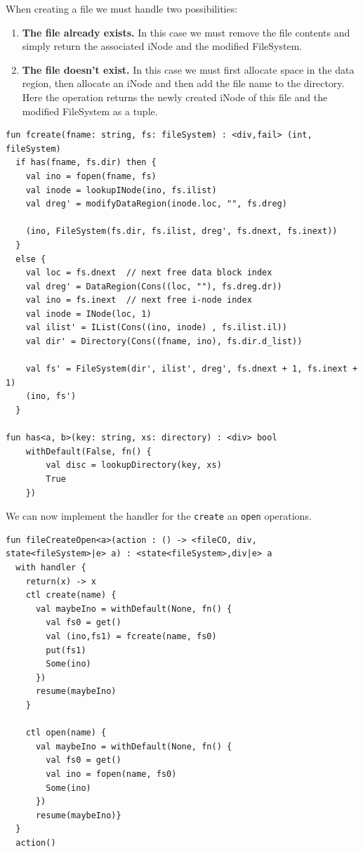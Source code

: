 \documentclass[logo,bsc,singlespacing,parskip]{infthesis}
\begin{document}
When creating a file we must handle two possibilities:
\begin{enumerate}
    \item \textbf{The file already exists.} In this case we must remove the file contents and simply return the associated  iNode and the modified FileSystem.
    \item \textbf{The file doesn't exist.} In this case we must first allocate space in the data region, then allocate an iNode and then add the file name to the directory. Here the operation returns the newly created iNode of this file and the modified FileSystem as a tuple.
\end{enumerate}

\begin{lstlisting}
fun fcreate(fname: string, fs: fileSystem) : <div,fail> (int, fileSystem) 
  if has(fname, fs.dir) then {
    val ino = fopen(fname, fs)  
    val inode = lookupINode(ino, fs.ilist)  
    val dreg' = modifyDataRegion(inode.loc, "", fs.dreg)  

    (ino, FileSystem(fs.dir, fs.ilist, dreg', fs.dnext, fs.inext))  
  }
  else {
    val loc = fs.dnext  // next free data block index
    val dreg' = DataRegion(Cons((loc, ""), fs.dreg.dr))  
    val ino = fs.inext  // next free i-node index
    val inode = INode(loc, 1)  
    val ilist' = IList(Cons((ino, inode) , fs.ilist.il))  
    val dir' = Directory(Cons((fname, ino), fs.dir.d_list))
    
    val fs' = FileSystem(dir', ilist', dreg', fs.dnext + 1, fs.inext + 1)  
    (ino, fs')
  }

fun has<a, b>(key: string, xs: directory) : <div> bool
    withDefault(False, fn() {
        val disc = lookupDirectory(key, xs)  
        True  
    })
\end{lstlisting}

We can now implement the handler for the \lstinline{create} an \lstinline{open} operations.

\begin{lstlisting}
fun fileCreateOpen<a>(action : () -> <fileCO, div, state<fileSystem>|e> a) : <state<fileSystem>,div|e> a
  with handler {
    return(x) -> x
    ctl create(name) {
      val maybeIno = withDefault(None, fn() {
        val fs0 = get()
        val (ino,fs1) = fcreate(name, fs0)
        put(fs1)
        Some(ino)
      })
      resume(maybeIno)
    }

    ctl open(name) {
      val maybeIno = withDefault(None, fn() {
        val fs0 = get()
        val ino = fopen(name, fs0)
        Some(ino)
      })
      resume(maybeIno)}  
  }
  action()
\end{lstlisting}
\end{document}
